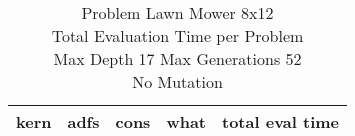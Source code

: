 \begin{table}[H]
\caption{Problem  Lawn Mower 8x12\\Total Evaluation Time per Problem \\ Max Depth 17 Max Generations 52\\ No Mutation \\}
\begin{center}
\scalebox{1.0} %
{
\begin{tabular}{llllr}
\hline
kern & adfs & cons & what & total eval time \\
\hline


\end{tabular}
}
\end{center}
\end{table}

